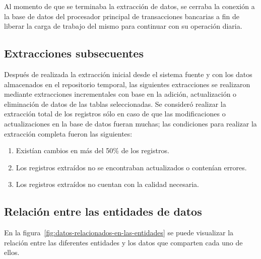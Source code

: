 Al momento de que se terminaba la extracción de datos, se cerraba la conexión a
la base de datos del procesador principal de transacciones bancarias a fin de
liberar la carga de trabajo del mismo para continuar con su operación diaria.

\subsection{Extracciones subsecuentes}

Después de realizada la extracción inicial desde el sistema fuente y con los
datos almacenados en el repositorio temporal, las siguientes extracciones se
realizaron mediante extracciones incrementales con base en la adición,
actualización o eliminación de datos de las tablas seleccionadas. Se consideró
realizar la extracción total de los registros sólo en caso de que las
modificaciones o actualizaciones en la base de datos fueran muchas; las
condiciones para realizar la extracción completa fueron las siguientes:

\begin{enumerate}
\item Existían cambios en más del 50\% de los registros.
\item Los registros extraídos no se encontraban actualizados o contenían
  errores.
\item Los registros extraídos no cuentan con la calidad necesaria.
\end{enumerate}

\subsection{Relación entre las entidades de datos}

En la figura~\ref{fig:datos-relacionados-en-las-entidades} se puede visualizar
la relación entre las diferentes entidades y los datos que comparten cada uno de
ellos.

